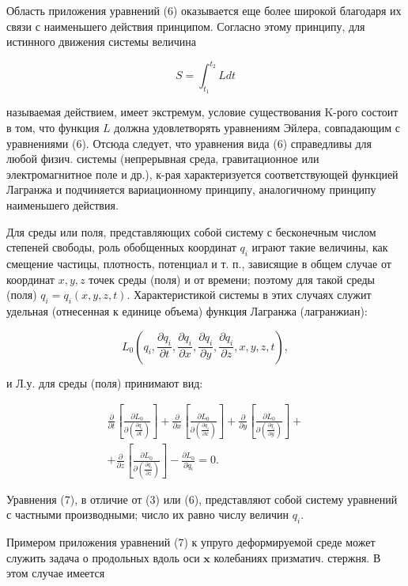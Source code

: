 \documentclass[10pt]{article}
\begin{document}
Область приложения уравнений (6) оказывается еще более широкой благодаря их связи с наименьшего действия принципом. Согласно этому принципу, для истинного движения системы величина



\[

S=\int_{t_{1}}^{t_{2}} L d t

\]



называемая действием, имеет экстремум, условие существования K-рого состоит в том, что функция $L$ должна удовлетворять уравнениям Эйлера, совпадающим с уравнениями (6). Отсюда следует, что уравнения вида (6) справедливы для любой физич. системы (непрерывная среда, гравитационное или электромагнитное поле и др.), к-рая характеризуется соответствующей функцией Лагранжа и подчиняется вариационному принципу, аналогичному принципу наименьшего действия.



Для среды или поля, представляющих собой систему с бесконечным числом степеней свободы, роль обобщенных координат $q_{i}$ играют такие величины, как смещение частицы, плотность, потенциал и т. п., зависящие в общем случае от координат $x, y, z$ точек среды (поля) и от времени; поэтому для такой среды (поля) $q_{i}=q_{i}(x, y, z, t)$. Характеристикой системы в этих случаях служит удельная (отнесенная к единице объема) функция Лагранжа (лагранжиан):



\[

L_{0}\left(q_{i}, \frac{\partial q_{i}}{\partial t}, \frac{\partial q_{i}}{\partial x}, \frac{\partial q_{i}}{\partial y}, \frac{\partial q_{i}}{\partial z}, x, y, z, t\right),

\]



и Л.у. для среды (поля) принимают вид:



\[

\begin{gathered}

\frac{\partial}{\partial t}\left[\frac{\partial L_{0}}{\partial\left(\frac{\partial q_{i}}{\partial t}\right)}\right]+\frac{\partial}{\partial x}\left[\frac{\partial L_{0}}{\partial\left(\frac{\partial q_{i}}{\partial x}\right)}\right]+\frac{\partial}{\partial y}\left[\frac{\partial L_{0}}{\partial\left(\frac{\partial q_{i}}{\partial y}\right)}\right]+ \\

+\frac{\partial}{\partial z}\left[\frac{\partial L_{0}}{\partial\left(\frac{\partial q_{i}}{\partial z}\right)}\right]-\frac{\partial L_{0}}{\partial q_{i}}=0 .

\end{gathered}

\]



Уравнения (7), в отличие от (3) или (6), представляют собой систему уравнений с частными производными; число их равно числу величин $q_{i}$.



Примером приложения уравнений (7) к упруго деформируемой среде может служить задача о продольных вдоль оси $\boldsymbol{x}$ колебаниях призматич. стержня. В этом случае имеется
\end{document}
